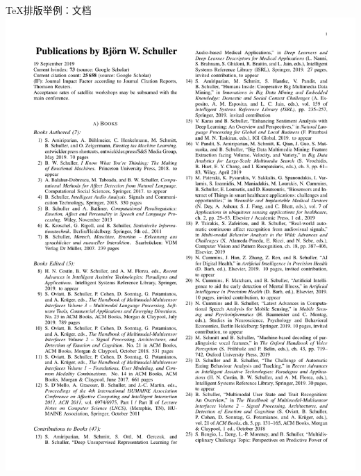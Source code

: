 \documentclass[UTF8,11pt]{beamer}
\begin{document}
\begin{frame}{\TeX 排版举例：文档}
	\includegraphics[scale=0.25]{figure/bib}

\end{frame}
\end{document}
